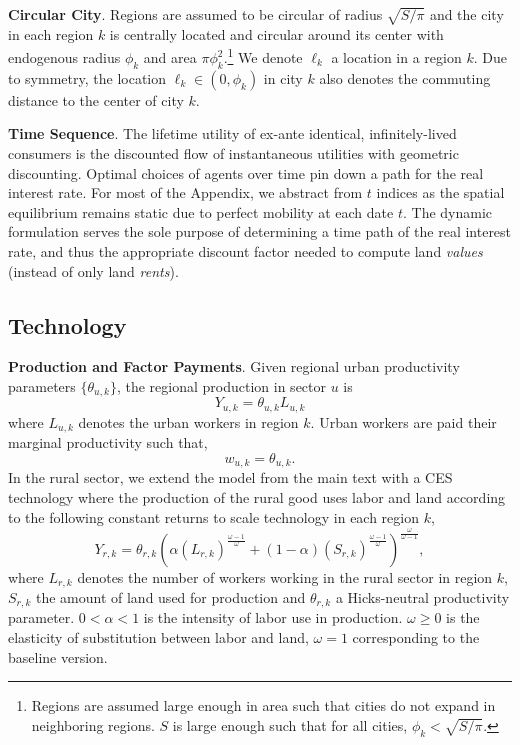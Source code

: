 \documentclass[11pt]{report}
\begin{document}
\noindent \textbf{Circular City}. Regions are assumed to be circular of radius $\sqrt{S/\pi}$ and the city in each region $k$ is centrally located and circular around its center with endogenous radius $\phi_k$ and area $\pi\phi_k^2$.\footnote{Regions are assumed large enough in area such that cities do not expand in neighboring regions. $S$ is large enough such that for all cities, $\phi_k<\sqrt{S/\pi}$.} We denote $\ell_k$ a location in a region $k$. Due to symmetry, the location $\ell_k \in (0,\phi_k)$ in city $k$ also denotes the commuting distance to the center of city $k$. 

\noindent \textbf{Time Sequence}. The lifetime utility of ex-ante identical, infinitely-lived consumers is the discounted flow of instantaneous utilities with geometric discounting. Optimal choices of agents over time pin down a path for the real interest rate. For most of the Appendix, we abstract from $t$ indices as the spatial equilibrium remains static due to perfect mobility at each date $t$. The dynamic formulation serves the sole purpose of determining a time path of the real interest rate, and thus the appropriate discount factor needed to compute land \emph{values} (instead of only land \emph{rents}).

\subsection{Technology}\label{B-sec:extensions-technology}

\noindent \textbf{Production and Factor Payments}. Given regional urban productivity parameters $\{\theta_{u,k}\}$, the regional production in sector $u$ is
\begin{equation*}
	Y_{u,k} =\theta_{u,k}L_{u,k}  
\end{equation*}
where $L_{u,k}$ denotes the urban workers in region $k$. Urban workers are paid their marginal productivity such that,
\begin{equation}
w_{u,k} =\theta_{u,k}. \label{B-eq:foc-wu}
\end{equation} 
In the rural sector, we extend the model from the main text with a CES technology where the production of the rural good uses labor and land according to the following constant returns to scale technology in each region $k$,
\begin{equation*}
Y_{r,k}=\theta_{r,k}\left(\alpha (L_{r,k})^{\frac{\omega-1}{\omega}} +(1-\alpha)(S_{r,k})^{\frac{\omega-1}{\omega}} \right)^{\frac{\omega}{\omega-1}},
\end{equation*}
where $L_{r,k}$ denotes the number of workers working in the rural sector in region $k$, $S_{r,k}$ the amount of land used for production and $\theta_{r,k}$ a Hicks-neutral productivity parameter. $0<\alpha<1$ is the intensity of labor use in production. $\omega \geq 0$ is the elasticity of substitution between labor and land, $\omega=1$ corresponding to the baseline version. 
\end{document}
